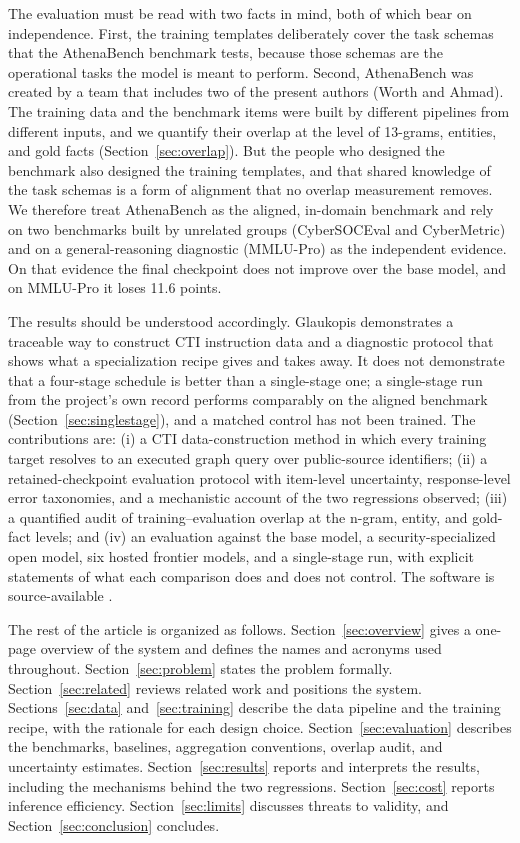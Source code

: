 \documentclass[twocolumn]{svjour3}
\begin{document}
The evaluation must be read with two facts in mind, both of which bear on independence. First, the training templates deliberately cover the task schemas that the AthenaBench benchmark tests, because those schemas are the operational tasks the model is meant to perform. Second, AthenaBench was created by a team that includes two of the present authors (Worth and Ahmad). The training data and the benchmark items were built by different pipelines from different inputs, and we quantify their overlap at the level of 13-grams, entities, and gold facts (Section~\ref{sec:overlap}). But the people who designed the benchmark also designed the training templates, and that shared knowledge of the task schemas is a form of alignment that no overlap measurement removes. We therefore treat AthenaBench as the aligned, in-domain benchmark and rely on two benchmarks built by unrelated groups (CyberSOCEval and CyberMetric) and on a general-reasoning diagnostic (MMLU-Pro) as the independent evidence. On that evidence the final checkpoint does not improve over the base model, and on MMLU-Pro it loses 11.6 points.

The results should be understood accordingly. Glaukopis demonstrates a traceable way to construct CTI instruction data and a diagnostic protocol that shows what a specialization recipe gives and takes away. It does not demonstrate that a four-stage schedule is better than a single-stage one; a single-stage run from the project's own record performs comparably on the aligned benchmark (Section~\ref{sec:singlestage}), and a matched control has not been trained. The contributions are: (i) a CTI data-construction method in which every training target resolves to an executed graph query over public-source identifiers; (ii) a retained-checkpoint evaluation protocol with item-level uncertainty, response-level error taxonomies, and a mechanistic account of the two regressions observed; (iii) a quantified audit of training--evaluation overlap at the n-gram, entity, and gold-fact levels; and (iv) an evaluation against the base model, a security-specialized open model, six hosted frontier models, and a single-stage run, with explicit statements of what each comparison does and does not control. The software is source-available \cite{glaukopis2026software}.

The rest of the article is organized as follows. Section~\ref{sec:overview} gives a one-page overview of the system and defines the names and acronyms used throughout. Section~\ref{sec:problem} states the problem formally. Section~\ref{sec:related} reviews related work and positions the system. Sections~\ref{sec:data} and~\ref{sec:training} describe the data pipeline and the training recipe, with the rationale for each design choice. Section~\ref{sec:evaluation} describes the benchmarks, baselines, aggregation conventions, overlap audit, and uncertainty estimates. Section~\ref{sec:results} reports and interprets the results, including the mechanisms behind the two regressions. Section~\ref{sec:cost} reports inference efficiency. Section~\ref{sec:limits} discusses threats to validity, and Section~\ref{sec:conclusion} concludes.
\end{document}
